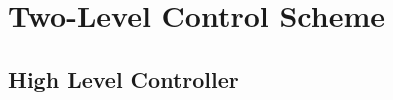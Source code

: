 %
%


\section{Two-Level Control Scheme}\label{sec:control}


\subsection{High Level Controller}\label{sec:hlc}



